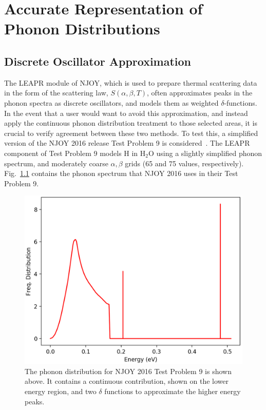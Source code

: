 \documentclass[Master.tex]{subfiles}
\begin{document}
\chapter{Accurate Representation of Phonon Distributions}

\section{Discrete Oscillator Approximation}\label{sec:test9}
  The LEAPR module of NJOY, which is used to prepare thermal scattering data in the form of the scattering law, $S(\alpha,\beta,T)$, often approximates peaks in the phonon spectra as discrete oscillators, and models them as weighted $\delta$-functions. In the event that a user would want to avoid this approximation, and instead apply the continuous phonon distribution treatment to those selected areas, it is crucial to verify agreement between these two methods. To test this, a simplified version of the NJOY 2016 release Test Problem 9 is considered~\cite{njoy}. The LEAPR component of Test Problem 9 models H in H$_2$O using a slightly simplified phonon spectrum, and moderately coarse $\alpha,\beta$ grids (65 and 75 values, respectively). Fig.~\ref{fig:waterPhonon} contains the phonon spectrum that NJOY 2016 uses in their Test Problem 9. 
  \begin{figure}[h]
    \begin{center}
      \includegraphics[scale=0.7]{waterPhononDistb}
      \caption[Phonon Distribution for NJOY 2016 Test Problem 9]{The phonon distribution for NJOY 2016 Test Problem 9 is shown above. It contains a continuous contribution, shown on the lower energy region, and two $\delta$ functions to approximate the higher energy peaks. }
      \label{fig:waterPhonon}
    \end{center}
  \end{figure}
\end{document}
